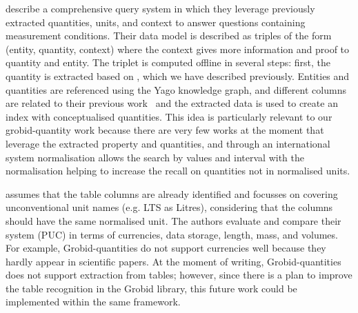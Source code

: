 \cite{ho2021qute} describe a comprehensive query system in which they leverage previously extracted quantities, units, and context to answer questions containing measurement conditions. 
Their data model is described as triples of the form (entity, quantity, context) where the context gives more information and proof to quantity and entity. 
The triplet is computed offline in several steps: first, the quantity is extracted based on \cite{roy2015reasoning}, which we have described previously. 
Entities and quantities are referenced using the Yago knowledge graph, and different columns are related to their previous work~\cite{ho2021extracting} and the extracted data is used to create an index with conceptualised quantities. 
This idea is particularly relevant to our grobid-quantity work because there are very few works at the moment that leverage the extracted property and quantities, and through an international system normalisation allows the search by values and interval with the normalisation helping to increase the recall on quantities not in normalised units. 

\cite{taha2021identifying} assumes that the table columns are already identified and focusses on covering unconventional unit names (e.g. LTS as Litres), considering that the columns should have the same normalised unit. The authors evaluate and compare their system (PUC) in terms of currencies, data storage, length, mass, and volumes. For example, Grobid-quantities do not support currencies well because they hardly appear in scientific papers. At the moment of writing, Grobid-quantities does not support extraction from tables; however, since there is a plan to improve the table recognition in the Grobid library, this future work could be implemented within the same framework. 





